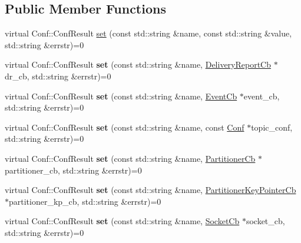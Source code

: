 \subsection*{Public Member Functions}
\begin{DoxyCompactItemize}
\item 
virtual Conf\-::\-Conf\-Result \hyperlink{classRdKafka_1_1Conf_ac122170f07773c5228916a3392929f20}{set} (const std\-::string \&name, const std\-::string \&value, std\-::string \&errstr)=0
\item 
\hypertarget{classRdKafka_1_1Conf_a3f6ff1cfaac16542927c3b21daa885a4}{virtual Conf\-::\-Conf\-Result {\bfseries set} (const std\-::string \&name, \hyperlink{classRdKafka_1_1DeliveryReportCb}{Delivery\-Report\-Cb} $\ast$dr\-\_\-cb, std\-::string \&errstr)=0}\label{classRdKafka_1_1Conf_a3f6ff1cfaac16542927c3b21daa885a4}

\item 
\hypertarget{classRdKafka_1_1Conf_a1230e95b69f64acfd5e0a3cacb9b593f}{virtual Conf\-::\-Conf\-Result {\bfseries set} (const std\-::string \&name, \hyperlink{classRdKafka_1_1EventCb}{Event\-Cb} $\ast$event\-\_\-cb, std\-::string \&errstr)=0}\label{classRdKafka_1_1Conf_a1230e95b69f64acfd5e0a3cacb9b593f}

\item 
\hypertarget{classRdKafka_1_1Conf_a542b0c4e968979dce8c0d3f4792c765b}{virtual Conf\-::\-Conf\-Result {\bfseries set} (const std\-::string \&name, const \hyperlink{classRdKafka_1_1Conf}{Conf} $\ast$topic\-\_\-conf, std\-::string \&errstr)=0}\label{classRdKafka_1_1Conf_a542b0c4e968979dce8c0d3f4792c765b}

\item 
\hypertarget{classRdKafka_1_1Conf_ae4e52f57b1cd216ad657095bd90659b1}{virtual Conf\-::\-Conf\-Result {\bfseries set} (const std\-::string \&name, \hyperlink{classRdKafka_1_1PartitionerCb}{Partitioner\-Cb} $\ast$partitioner\-\_\-cb, std\-::string \&errstr)=0}\label{classRdKafka_1_1Conf_ae4e52f57b1cd216ad657095bd90659b1}

\item 
\hypertarget{classRdKafka_1_1Conf_a2243832a848942f85a537dc3eaaeaf72}{virtual Conf\-::\-Conf\-Result {\bfseries set} (const std\-::string \&name, \hyperlink{classRdKafka_1_1PartitionerKeyPointerCb}{Partitioner\-Key\-Pointer\-Cb} $\ast$partitioner\-\_\-kp\-\_\-cb, std\-::string \&errstr)=0}\label{classRdKafka_1_1Conf_a2243832a848942f85a537dc3eaaeaf72}

\item 
\hypertarget{classRdKafka_1_1Conf_aa10c8c7f4e88d733509dd0a549a0628d}{virtual Conf\-::\-Conf\-Result {\bfseries set} (const std\-::string \&name, \hyperlink{classRdKafka_1_1SocketCb}{Socket\-Cb} $\ast$socket\-\_\-cb, std\-::string \&errstr)=0}\label{classRdKafka_1_1Conf_aa10c8c7f4e88d733509dd0a549a0628d}


\end{DoxyCompactItemize}
